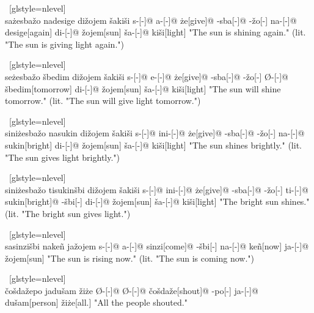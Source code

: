 \ex~[glstyle=nlevel]
\begingl
\glpreamble {} \\ sa\.{z}esba\v{z}o nadesige di\v{z}ojem \v{s}aki\v{s}i
\endpreamble
s-[{\Ind}-]@
a-[{\Prog}-]@
\.{z}e[give]@
-sba[-{\Inan}]@
-\v{z}o[-{\Inan}]
na-[{\Prog}-]@
desige[again]
di-[{\Erg}-]@
\v{z}ojem[sun]
\v{s}a-[{\Acc}-]@
ki\v{s}i[light]
\glft "The sun is shining again." (lit. "The sun is giving light again.")
\endgl
\xe

\ex~[glstyle=nlevel]
\begingl
\glpreamble {} \\ se\.{z}esba\v{z}o \v{s}bedim di\v{z}ojem \v{s}aki\v{s}i
\endpreamble
s-[{\Ind}-]@
e-[{\Pfv}-]@
\.{z}e[give]@
-sba[-{\Inan}]@
-\v{z}o[-{\Inan}]
Ø-[{\Pfv}-]@
\v{s}bedim[tomorrow]
di-[{\Erg}-]@
\v{z}ojem[sun]
\v{s}a-[{\Acc}-]@
ki\v{s}i[light]
\glft "The sun will shine tomorrow." (lit. "The sun will give light tomorrow.")
\endgl
\xe

\ex~[glstyle=nlevel]
\begingl
\glpreamble {} \\ sini\.{z}esba\v{z}o nasukin di\v{z}ojem \v{s}aki\v{s}i
\endpreamble
s-[{\Ind}-]@
ini-[{\Hab}-]@
\.{z}e[give]@
-sba[-{\Inan}]@
-\v{z}o[-{\Inan}]
na-[{\Prog}-]@
sukin[bright]
di-[{\Erg}-]@
\v{z}ojem[sun]
\v{s}a-[{\Acc}-]@
ki\v{s}i[light]
\glft "The sun shines brightly." (lit. "The sun gives light brightly.")
\endgl
\xe

\ex~[glstyle=nlevel]
\begingl
\glpreamble {} \\ sini\.{z}esba\v{z}o tisukin\v{s}bi di\v{z}ojem \v{s}aki\v{s}i
\endpreamble
s-[{\Ind}-]@
ini-[{\Hab}-]@
\.{z}e[give]@
-sba[-{\Inan}]@
-\v{z}o[-{\Inan}]
ti-[{\Erg}-]@
sukin[bright]@
-\v{s}bi[-{\Inan}]
di-[{\Erg}-]@
\v{z}ojem[sun]
\v{s}a-[{\Acc}-]@
ki\v{s}i[light]
\glft "The bright sun shines." (lit. "The bright sun gives light.")
\endgl
\xe

\ex~[glstyle=nlevel]
\begingl
\glpreamble {} \\ sasinzi\v{s}bi nakeñ ja\v{z}ojem
\endpreamble
s-[{\Ind}-]@
a-[{\Prog}-]@
sinzi[come]@
-\v{s}bi[-{\Inan}]
na-[{\Prog}-]@
keñ[now]
ja-[{\Nom}-]@
\v{z}ojem[sun]
\glft "The sun is rising now." (lit. "The sun is coming now.")
\endgl
\xe

\ex~[glstyle=nlevel]
\begingl
\glpreamble {} \\ \v{c}o\v{s}da\v{z}epo jadu\v{s}am \v{z}i\.{z}e
\endpreamble
Ø-[{\Ind}-]@
Ø-[{\Pfv}-]@
\v{c}o\v{s}da\v{z}e[shout]@
-po[-{\Hg}]
ja-[{\Nom}-]@
du\v{s}am[person]
\v{z}i\.{z}e[all.{\Hg}]
\glft "All the people shouted."
\endgl
\xe

